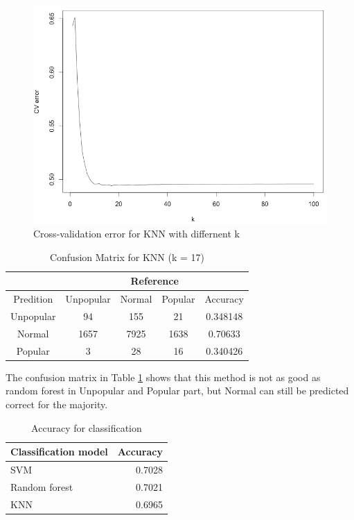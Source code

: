 \documentclass[12pt]{article}
\begin{document}
    \begin{figure}[h]
        \centering
        \includegraphics[width=0.7\linewidth]{knn_cv.png}
        \caption{Cross-validation error for KNN with differnent k}
    \end{figure}

    \begin{table}[h]
        \centering
        \caption{Confusion Matrix for KNN (k = 17)}
        \begin{tabular}{ c | c | c | c | c }
            \hline\hline
            {} & \multicolumn{4}{c}{Reference} \\
            \hline
            Predition & Unpopular & Normal & Popular & Accuracy\\
            \hline
            Unpopular & 94 & 155 & 21 & 0.348148\\
            \hline
            Normal & 1657 & 7925 & 1638 & 0.70633\\
            \hline
            Popular & 3 & 28 & 16 & 0.340426\\
            \hline\hline
        \end{tabular}
        \label{table:knn}
    \end{table}

The confusion matrix in Table \ref{table:knn} shows that this method is not as good as random forest in Unpopular and Popular part, but Normal can still be predicted correct for the majority.

    \begin{table}[h]
        \centering
        \caption{Accuracy for classification}
        \begin{tabular}{ l | r }
            \hline\hline
            Classification model & Accuracy\\
            \hline
            SVM & 0.7028 \\
            Random forest & 0.7021 \\
            KNN & 0.6965 \\
            \hline\hline
        \end{tabular}
        \label{table:1}
    \end{table}
\end{document}
